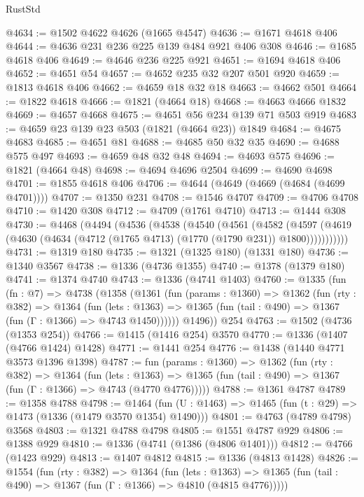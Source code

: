 \begin{lexlean}{RustStd}
\begin{coremodule}
@4634 := @1502 @4622 @4626 (@1665 @4547)
@4636 := @1671 @4618 @406
@4644 := @4636 @231 @236 @225 @139 @484 @921 @406 @308
@4646 := @1685 @4618 @406
@4649 := @4646 @236 @225 @921
@4651 := @1694 @4618 @406
@4652 := @4651 @54
@4657 := @4652 @235 @32 @207 @501 @920
@4659 := @1813 @4618 @406
@4662 := @4659 @18 @32 @18
@4663 := @4662 @501
@4664 := @1822 @4618
@4666 := @1821 (@4664 @18)
@4668 := @4663 @4666 @1832
@4669 := @4657 @4668
@4675 := @4651 @56 @234 @139 @71 @503 @919
@4683 := @4659 @23 @139 @23 @503 (@1821 (@4664 @23)) @1849
@4684 := @4675 @4683
@4685 := @4651 @81
@4688 := @4685 @50 @32 @35
@4690 := @4688 @575 @497
@4693 := @4659 @48 @32 @48
@4694 := @4693 @575
@4696 := @1821 (@4664 @48)
@4698 := @4694 @4696 @2504
@4699 := @4690 @4698
@4701 := @1855 @4618 @406
@4706 := @4644 (@4649 (@4669 (@4684 (@4699 @4701))))
@4707 := @1350 @231
@4708 := @1546 @4707
@4709 := @4706 @4708
@4710 := @1420 @308
@4712 := @4709 (@1761 @4710)
@4713 := @1444 @308
@4730 := @4468
    (@4494
      (@4536
        (@4538
          (@4540
            (@4561
              (@4582
                (@4597
                  (@4619 (@4630 (@4634 (@4712 (@1765 @4713) (@1770 (@1790 @231)) @1800)))))))))))
@4731 := @1319 @180
@4735 := @1321 (@1325 @180) (@1331 @180)
@4736 := @1340 @3567
@4738 := @1336 (@4736 @1355)
@4740 := @1378 (@1379 @180)
@4741 := @1374 @4740
@4743 := @1336 (@4741 @1403)
@4760 := @1335
    (fun (fn : @7) =>
    @4738
      (@1358
        (@1361
          (fun (params : @1360) =>
          @1362
            (fun (rty : @382) =>
            @1364
              (fun (lets : @1363) =>
              @1365 (fun (tail : @490) => @1367 (fun (Γ : @1366) => @4743 @1450))))))
        @1496))
    @254
@4763 := @1502 (@4736 (@1353 @254))
@4766 := @1415 (@1416 @254) @3570
@4770 := @1336 (@1407 (@4766 @1424) @1428)
@4771 := @1441 @254
@4776 := @1438 (@1440 @4771 @3573 @1396 @1398)
@4787 := fun (params : @1360) =>
  @1362
    (fun (rty : @382) =>
    @1364
      (fun (lets : @1363) =>
      @1365 (fun (tail : @490) => @1367 (fun (Γ : @1366) => @4743 (@4770 @4776)))))
@4788 := @1361 @4787
@4789 := @1358 @4788
@4798 := @1464 (fun (U : @1463) => @1465 (fun (t : @29) => @1473 (@1336 (@1479 @3570 @1354) @1490)))
@4801 := @4763 (@4789 @4798) @3568
@4803 := @1321 @4788 @4798
@4805 := @1551 @4787 @929
@4806 := @1388 @929
@4810 := @1336 (@4741 (@1386 (@4806 @1401)))
@4812 := @4766 (@1423 @929)
@4813 := @1407 @4812
@4815 := @1336 (@4813 @1428)
@4826 := @1554
    (fun (rty : @382) =>
    @1364
      (fun (lets : @1363) =>
      @1365 (fun (tail : @490) => @1367 (fun (Γ : @1366) => @4810 (@4815 @4776)))))

\end{coremodule}
\end{lexlean}
